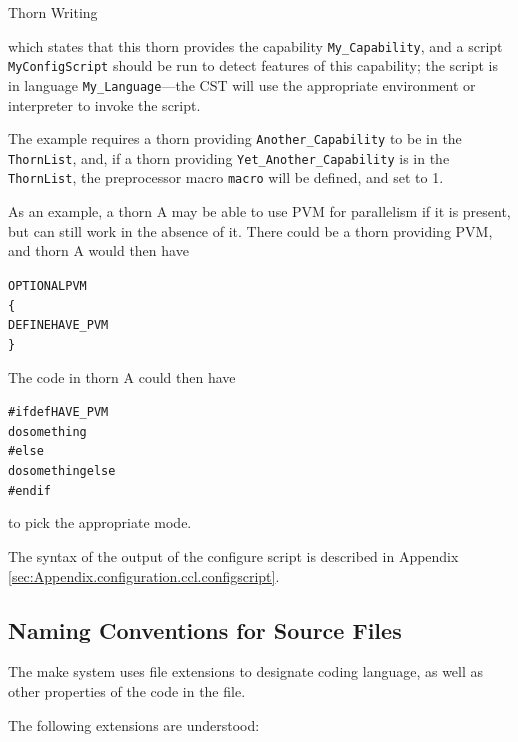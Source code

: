 \begin{cactuspart}{Thorn Writing}
\begin{alltt}
\end{alltt}

which states that this thorn provides the capability
\verb|My_Capability|, and a script \verb|MyConfigScript| should be run
to detect features of this capability; the script is in language
\verb|My_Language|---the CST will use the appropriate environment or
interpreter to invoke the script.

The example requires a thorn providing \verb|Another_Capability| to be
in the \texttt{ThornList}, and, if a thorn providing
\verb|Yet_Another_Capability| is in the \texttt{ThornList}, the preprocessor
macro \verb|macro| will be defined, and set to 1.

As an example, a thorn A may be able to use PVM for parallelism if it is
present, but can still work in the absence of it.  There could be a
thorn providing PVM, and thorn A would then have

\begin{alltt}
OPTIONAL PVM
\{
  DEFINE HAVE_PVM
\}

\end{alltt}

The code in thorn A could then have

\begin{alltt}

#ifdef HAVE_PVM
  do something
#else
  do something else
#endif

\end{alltt}

to pick the appropriate mode.

The syntax of the output of the configure script is described in
Appendix \ref{sec:Appendix.configuration.ccl.configscript}.



\subsection{Naming Conventions for Source Files}
\label{nacofosofi}

The make system uses file extensions to designate coding language,
as well as other properties of the code in the file.

The following extensions are understood:


\end{cactuspart}
